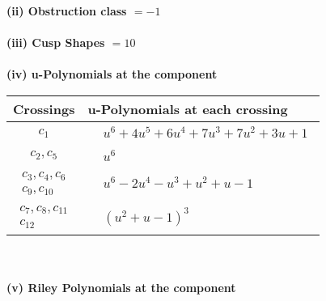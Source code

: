 \documentclass[1p]{elsarticle_modified}
\theoremstyle{definition}
\begin{document}
\flushleft \textbf{(ii) Obstruction class $= -1$}\\~\\
\flushleft \textbf{(iii) Cusp Shapes $= 10$}\\~\\
\newpage\renewcommand{\arraystretch}{1}
\flushleft \textbf{(iv) u-Polynomials at the component}\newline \\
\begin{tabular}{m{50pt}|m{274pt}}
Crossings & \hspace{64pt}u-Polynomials at each crossing \\
\hline $$\begin{aligned}c_{1}\end{aligned}$$&$\begin{aligned}
&u^6+4 u^5+6 u^4+7 u^3+7 u^2+3 u+1
\end{aligned}$\\
\hline $$\begin{aligned}c_{2},c_{5}\end{aligned}$$&$\begin{aligned}
&u^6
\end{aligned}$\\
\hline $$\begin{aligned}c_{3},c_{4},c_{6}\\c_{9},c_{10}\end{aligned}$$&$\begin{aligned}
&u^6-2 u^4- u^3+u^2+u-1
\end{aligned}$\\
\hline $$\begin{aligned}c_{7},c_{8},c_{11}\\c_{12}\end{aligned}$$&$\begin{aligned}
&(u^2+u-1)^3
\end{aligned}$\\
\hline
\end{tabular}\\~\\
\newpage\renewcommand{\arraystretch}{1}
\flushleft \textbf{(v) Riley Polynomials at the component}\newline \\
\end{document}
